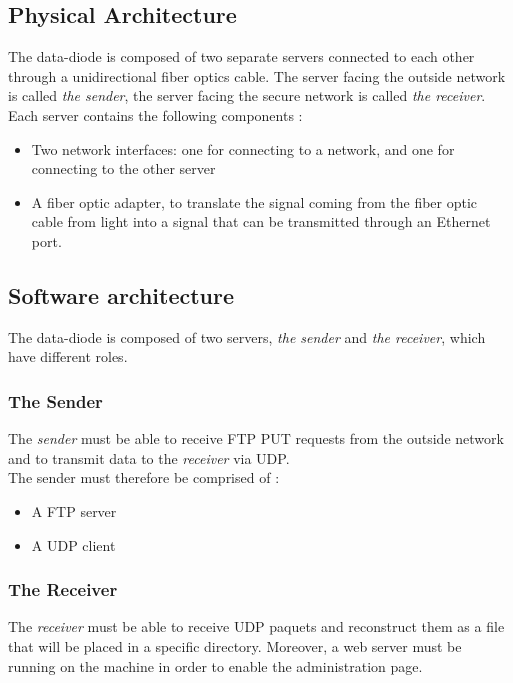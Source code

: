 \documentclass[a4paper,11pt]{article}
\begin{document}
\begin{center}
\begin{tabular}{cc}
\end{tabular}
\end{center} 




\subsection{Physical Architecture}
The data-diode is composed of two separate servers connected to each other through a unidirectional fiber optics cable. The server facing the outside network is called \textit{the sender}, the server facing the secure network is called \textit{the receiver}.\\

Each server contains the following components :
\begin{itemize}
\item{Two network interfaces: one for connecting to a network, and one for connecting to the other server}
\item{A fiber optic adapter, to translate the signal coming from the fiber optic cable from light into a signal that can be transmitted through an Ethernet port.}
\end{itemize}

\subsection{Software architecture}
The data-diode is composed of two servers, \textit{the sender} and \textit{the receiver}, which have different roles. 

\subsubsection{The Sender}
The \textit{sender} must be able to receive FTP PUT requests from the outside network and to transmit data to the \textit{receiver} via UDP.\\

The sender must therefore be comprised of :
\begin{itemize}
\item{A FTP server}
\item{A UDP client}
\end{itemize} 

\subsubsection{The Receiver}
The \textit{receiver} must be able to receive UDP paquets and reconstruct them as a file that will be placed in a specific directory. Moreover, a web server must be running on the machine in order to enable the administration page.\\
\end{document}
